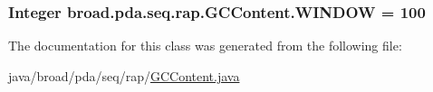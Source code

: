 \hypertarget{classbroad_1_1pda_1_1seq_1_1rap_1_1_g_c_content_a4b0d167d7940ab79dbc90ed0dc6741b1}{
\subsubsection[{W\+I\+N\+D\+O\+W}]{\setlength{\rightskip}{0pt plus 5cm}Integer broad.\+pda.\+seq.\+rap.\+G\+C\+Content.\+W\+I\+N\+D\+O\+W = 100}}\label{classbroad_1_1pda_1_1seq_1_1rap_1_1_g_c_content_a4b0d167d7940ab79dbc90ed0dc6741b1}


The documentation for this class was generated from the following file\+:\begin{DoxyCompactItemize}
\item 
java/broad/pda/seq/rap/\hyperlink{_g_c_content_8java}{G\+C\+Content.\+java}\end{DoxyCompactItemize}
